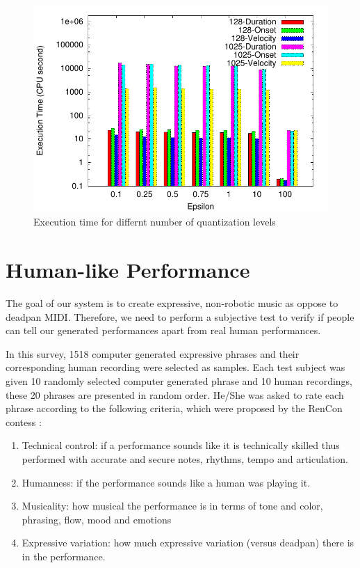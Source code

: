 \begin{figure}[tp]
   \begin{center}
      \includegraphics[width=\textwidth]{fig/quant_comp}
   \end{center}
   \caption{Execution time for differnt number of quantization levels}
   \label{fig:quant_comp}
\end{figure}

\section{Human-like Performance}
\label{sec:turing}
The goal of our system is to create expressive, non-robotic music as oppose to deadpan MIDI. Therefore, we need to perform a subjective test to verify if people can tell our generated performances apart from real human performances.

In this survey, 1518 computer generated expressive phrases and their corresponding human recording were selected as samples. Each test subject was given 10 randomly selected computer generated phrase and 10 human recordings, these 20 phrases are presented in random order. He/She was asked to rate each phrase according to the following criteria, which were proposed by the RenCon contess \cite{RenCon}:
\begin{enumerate}
   \item Technical control: if a performance sounds like it is technically skilled thus performed with accurate and secure notes, rhythms, tempo and articulation.
   \item  Humanness: if the performance sounds like a human was playing it.
   \item  Musicality: how musical the performance is in terms of tone and color, phrasing, flow, mood and emotions
   \item Expressive variation: how much expressive variation (versus deadpan) there is in the performance.
\end{enumerate}

